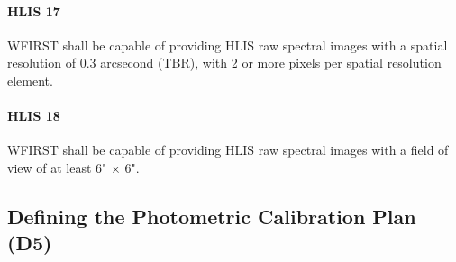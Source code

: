 \paragraph{HLIS 17} WFIRST shall be capable of providing HLIS raw spectral
images with a spatial resolution of 0.3 arcsecond (TBR), with 2 or more pixels
per spatial resolution element.

\paragraph{HLIS 18} WFIRST shall be capable of providing HLIS raw spectral
images with a field of view of at least 6" $\times$ 6".


\subsection{Defining the Photometric Calibration Plan (D5)}
\label{sec:wl_calibration}

